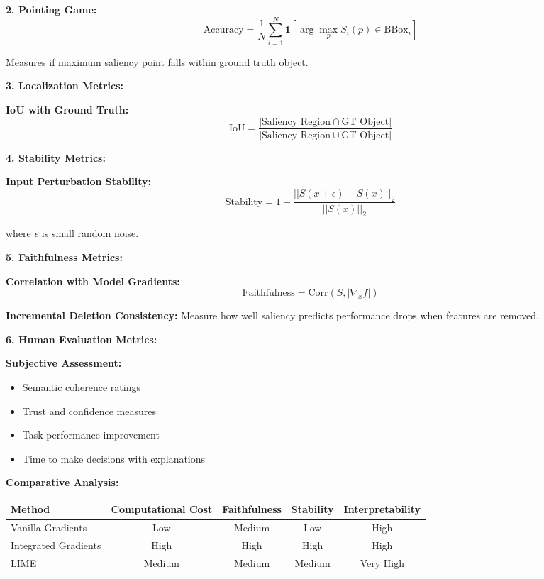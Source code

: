\documentclass[12pt]{article}
\begin{document}
\begin{enumerate}[(a)]
{    \textbf{2. Pointing Game:}
    $$\text{Accuracy} = \frac{1}{N} \sum_{i=1}^N \mathbf{1}[\arg\max_p S_i(p) \in \text{BBox}_i]$$
    
    Measures if maximum saliency point falls within ground truth object.
    
    \textbf{3. Localization Metrics:}
    
    \textbf{IoU with Ground Truth:}
    $$\text{IoU} = \frac{|\text{Saliency Region} \cap \text{GT Object}|}{|\text{Saliency Region} \cup \text{GT Object}|}$$
    
    \textbf{4. Stability Metrics:}
    
    \textbf{Input Perturbation Stability:}
    $$\text{Stability} = 1 - \frac{||S(x + \epsilon) - S(x)||_2}{||S(x)||_2}$$
    
    where $\epsilon$ is small random noise.
    
    \textbf{5. Faithfulness Metrics:}
    
    \textbf{Correlation with Model Gradients:}
    $$\text{Faithfulness} = \text{Corr}(S, |\nabla_x f|)$$
    
    \textbf{Incremental Deletion Consistency:}
    Measure how well saliency predicts performance drops when features are removed.
    
    \textbf{6. Human Evaluation Metrics:}
    
    \textbf{Subjective Assessment:}
    \begin{itemize}
        \item Semantic coherence ratings
        \item Trust and confidence measures
        \item Task performance improvement
        \item Time to make decisions with explanations
    \end{itemize}
    
    \textbf{Comparative Analysis:}
    
    \begin{center}
    \begin{tabular}{|l|c|c|c|c|}
    \hline
    Method & Computational Cost & Faithfulness & Stability & Interpretability \\
    \hline
    Vanilla Gradients & Low & Medium & Low & High \\
    Integrated Gradients & High & High & High & High \\
    LIME & Medium & Medium & Medium & Very High \\
    \hline
    \end{tabular}
    \end{center}
    
}
\end{enumerate}
\end{document}
